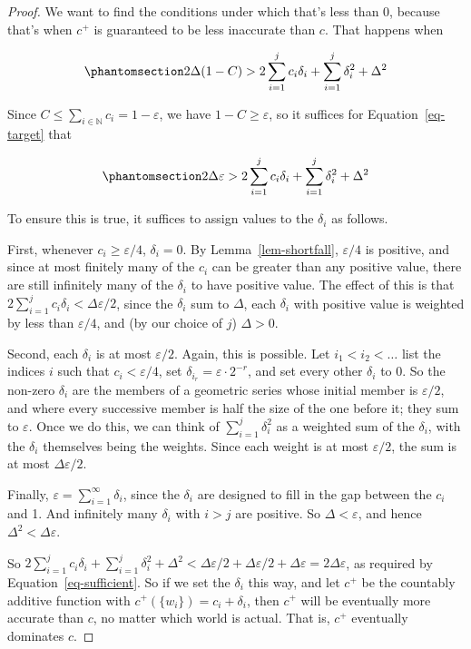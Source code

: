 \documentclass[
  11pt,
  letterpaper,
  DIV=11,
  numbers=noendperiod,
  twoside]{scrartcl}
\theoremstyle{definition}
\theoremstyle{plain}
\theoremstyle{plain}
\theoremstyle{remark}
\begin{document}
\begin{proof}
We want to find the conditions under which that's less than 0, because
that's when \(c^+\) is guaranteed to be less inaccurate than \(c\). That
happens when

\begin{equation}\protect\phantomsection\label{eq-target}{
2\Delta(1-C) > 2\sum_{i=1}^j c_i \delta_i + \sum_{i=1}^j \delta_i^2 + \Delta^2
}\end{equation}

Since \(C \leqslant \sum_{i \in \mathbb{N}} c_i = 1 - \varepsilon\), we
have \(1-C \geqslant \varepsilon\), so it suffices for
Equation~\ref{eq-target} that

\begin{equation}\protect\phantomsection\label{eq-sufficient}{
2\Delta\varepsilon > 2\sum_{i=1}^j c_i \delta_i + \sum_{i=1}^j \delta_i^2 + \Delta^2
}\end{equation}

To ensure this is true, it suffices to assign values to the \(\delta_i\)
as follows.

First, whenever \(c_i \geqslant \varepsilon/4\), \(\delta_i = 0\). By
Lemma~\ref{lem-shortfall}, \(\varepsilon/4\) is positive, and since at
most finitely many of the \(c_i\) can be greater than any positive
value, there are still infinitely many of the \(\delta_i\) to have
positive value. The effect of this is that
\(2\sum_{i=1}^j c_i \delta_i < \Delta\varepsilon/2\), since the
\(\delta_i\) sum to \(\Delta\), each \(\delta_i\) with positive value is
weighted by less than \(\varepsilon/4\), and (by our choice of \(j\))
\(\Delta > 0\).

Second, each \(\delta_i\) is at most \(\varepsilon/2\). Again, this is
possible. Let \(i_1 < i_2 < \dots\) list the indices \(i\) such that
\(c_i < \varepsilon/4\), set
\(\delta_{i_r} = \varepsilon \cdot 2^{-r}\), and set every other
\(\delta_i\) to 0. So the non-zero \(\delta_i\) are the members of a
geometric series whose initial member is \(\varepsilon/2\), and where
every successive member is half the size of the one before it; they sum
to \(\varepsilon\). Once we do this, we can think of
\(\sum_{i=1}^j \delta_i^2\) as a weighted sum of the \(\delta_i\), with
the \(\delta_i\) themselves being the weights. Since each weight is at
most \(\varepsilon/2\), the sum is at most \(\Delta\varepsilon/2\).

Finally, \(\varepsilon = \sum_{i=1}^\infty \delta_i\), since the
\(\delta_i\) are designed to fill in the gap between the \(c_i\) and 1.
And infinitely many \(\delta_i\) with \(i > j\) are positive. So
\(\Delta < \varepsilon\), and hence \(\Delta^2 < \Delta\varepsilon\).

So
\(2\sum_{i=1}^j c_i \delta_i + \sum_{i=1}^j \delta_i^2 + \Delta^2 < \Delta\varepsilon/2 + \Delta\varepsilon/2 + \Delta\varepsilon = 2\Delta\varepsilon\),
as required by Equation~\ref{eq-sufficient}. So if we set the
\(\delta_i\) this way, and let \(c^+\) be the countably additive
function with \(c^+(\{w_i\}) = c_i + \delta_i\), then \(c^+\) will be
eventually more accurate than \(c\), no matter which world is actual.
That is, \(c^+\) eventually dominates \(c\).
\end{proof}
\end{document}
